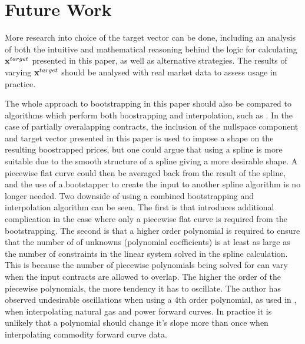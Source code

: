 \documentclass{article}
\begin{document}
\section{Future Work}
More research into choice of the target vector can be done, including an analysis of both
the intuitive and mathematical reasoning behind the logic for calculating $\mathbf{x}^{target}$ 
presented in this paper, as well as alternative strategies. The results of varying  
$\mathbf{x}^{target}$ should be analysed with real market data to assess usage in practice.

\bigskip

The whole approach to bootstrapping in this paper should also be compared to algorithms
which perform both boostrapping and interpolation, such as \cite{Benth}. In the case of
partially overalapping contracts, the inclusion of the nullspace component and target
vector presented in this paper is used to impose a shape on the resulting boostrapped
prices, but one could argue that using a spline is more suitable due to the smooth 
structure of a spline giving a more desirable shape. A piecewise flat curve could
then be averaged back from the result of the spline, and the use of a bootstapper
to create the input to another spline algorithm is no longer needed. Two downside of
using a combined bootstrapping and interpolation algorithm can be seen. The first
is that introduces additional complication in the case where only a piecewise flat
curve is required from the bootstrapping. The second is that a higher order polynomial
is required to ensure that the number of of unknowns (polynomial coefficients) is at
least as large as the number of constraints in the linear system solved in the spline
calculation. This is because the number of piecewise polynomials being solved for can 
vary when the input contracts are allowed to overlap. The higher the order of the
piecewise polynomials, the more tendency it has to oscillate.
The author has observed undesirable oscillations when using a 4th order polynomial,
as used in \cite{Benth}, when interpolating natural gas and power forward curves. 
In practice it is unlikely that a polynomial should change it's
slope more than once when interpolating commodity forward curve data.




\end{document}
